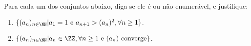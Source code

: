Para cada um dos conjuntos abaixo, diga se ele é ou não enumerável, e justifique:

\begin{enumerate}[label = (\alph*)]
	\item $\{ (a_n)_{n \in \NN} | a_1 = 1 \text{ e } a_{n+1} > (a_n)^2, \forall n \ge 1 \}$.
	\item $\{ (a_n)_{n \in \NN} | a_n \in \ZZ, \forall n \ge 1 \text{ e } (a_n) \text{ converge}\}$.
\end{enumerate}
